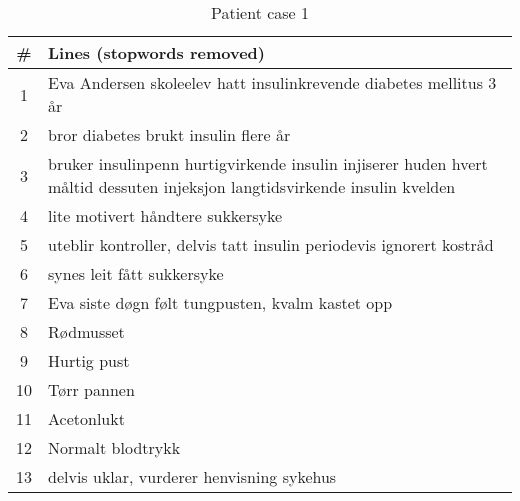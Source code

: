 \begin{table}[htbp] \footnotesize \center
\caption{Patient case 1\label{tab:case1}}
\begin{tabularx}{\textwidth}{c X}
    \toprule
    \# & Lines (stopwords removed) \\
    \midrule
    1 & Eva Andersen skoleelev hatt insulinkrevende diabetes mellitus 3 år \\
    2 & bror diabetes brukt insulin flere år \\
    3 & bruker insulinpenn hurtigvirkende insulin injiserer huden hvert måltid dessuten injeksjon langtidsvirkende insulin kvelden \\
    4 & lite motivert håndtere sukkersyke \\
    5 & uteblir kontroller, delvis tatt insulin periodevis ignorert kostråd \\
    6 & synes leit fått sukkersyke \\
    7 & Eva siste døgn følt tungpusten, kvalm kastet opp \\
    8 & Rødmusset \\
    9 & Hurtig pust \\
    10 & Tørr pannen \\
    11 & Acetonlukt \\
    12 & Normalt blodtrykk \\
    13 & delvis uklar, vurderer henvisning sykehus \\
    \bottomrule
\end{tabularx}
\end{table}

